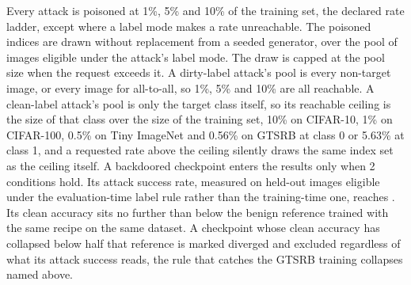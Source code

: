 Every attack is poisoned at 1\%, 5\% and 10\% of the training set, the declared rate ladder, except where a label mode makes a rate unreachable. The poisoned indices are drawn without replacement from a seeded generator, over the pool of images eligible under the attack's label mode. The draw is capped at the pool size when the request exceeds it. A dirty-label attack's pool is every non-target image, or every image for all-to-all, so 1\%, 5\% and 10\% are all reachable. A clean-label attack's pool is only the target class itself, so its reachable ceiling is the size of that class over the size of the training set, 10\% on CIFAR-10, 1\% on CIFAR-100, 0.5\% on Tiny ImageNet and 0.56\% on GTSRB at class 0 or 5.63\% at class 1, and a requested rate above the ceiling silently draws the same index set as the ceiling itself. A backdoored checkpoint enters the results only when 2 conditions hold. Its attack success rate, measured on held-out images eligible under the evaluation-time label rule rather than the training-time one, reaches \AsrBar{}. Its clean accuracy sits no further than \CleanDropBar{} below the benign reference trained with the same recipe on the same dataset. A checkpoint whose clean accuracy has collapsed below half that reference is marked diverged and excluded regardless of what its attack success reads, the rule that catches the GTSRB training collapses named above.
